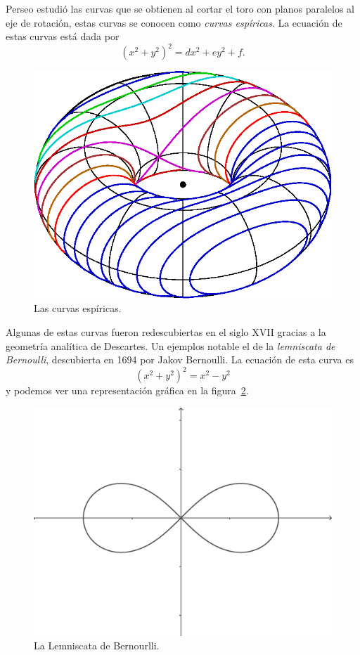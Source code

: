 Perseo estudió las curvas que se obtienen al cortar el toro
con planos paralelos al eje de rotación, estas curvas se conocen como 
\emph{curvas espíricas}. La ecuación de estas curvas está dada por
\[
	(x^2+y^2)^2=dx^2+ey^2+f.
\]

\begin{figure}
   \centering
   \includegraphics[scale=0.3]{images/spiric}
   \caption{Las curvas espíricas.}
   \label{fig:spiric}
\end{figure}



Algunas de estas curvas fueron redescubiertas en el
siglo XVII gracias a la geometría analítica de Descartes. Un ejemplos notable 
el de la \emph{lemniscata de Bernoulli}, descubierta en 1694 por Jakov Bernoulli. La ecuación 
de esta curva es 
\[
	(x^2+y^2)^2=x^2-y^2
\]
y podemos ver una representación gráfica en la figura~\ref{fig:lemniscata}.

\begin{figure}
   \centering
   \includegraphics[scale=0.2]{images/lemniscata}
   \caption{La Lemniscata de Bernourlli.}
   \label{fig:lemniscata}
\end{figure}
 
